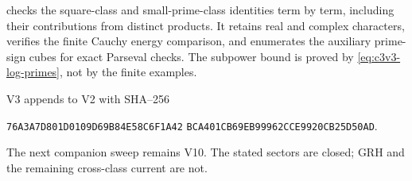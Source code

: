 \documentclass[11pt]{article}
\theoremstyle{remark}
\begin{document}
 checks the
square-class and small-prime-class identities term by term, including
their contributions from distinct products.  It retains real and
complex characters, verifies the finite Cauchy energy comparison,
and enumerates the auxiliary prime-sign cubes for exact Parseval
checks.  The subpower bound is proved by
\eqref{eq:c3v3-log-primes}, not by the finite examples.

V3 appends to V2 with SHA--256
\begin{center}
\texttt{76A3A7D801D0109D69B84E58C6F1A42}\allowbreak
\texttt{BCA401CB69EB99962CCE9920CB25D50AD}.
\end{center}
The next companion sweep remains V10.  The stated sectors are closed;
GRH and the remaining cross-class current are not.
\endgroup
\end{document}
